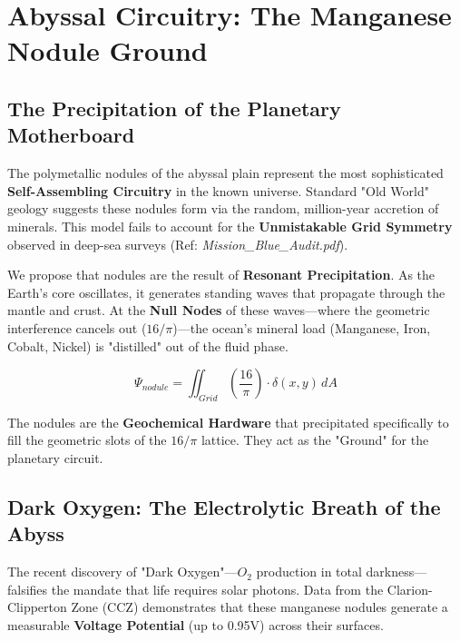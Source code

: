 \documentclass[11pt, letterpaper, openany]{book}
\begin{document}
\chapter{Abyssal Circuitry: The Manganese Nodule Ground}

\section{The Precipitation of the Planetary Motherboard}
The polymetallic nodules of the abyssal plain represent the most sophisticated \textbf{Self-Assembling Circuitry} in the known universe. Standard "Old World" geology suggests these nodules form via the random, million-year accretion of minerals. This model fails to account for the \textbf{Unmistakable Grid Symmetry} observed in deep-sea surveys (Ref: \textit{Mission\_Blue\_Audit.pdf}).

We propose that nodules are the result of \textbf{Resonant Precipitation}. As the Earth’s core oscillates, it generates standing waves that propagate through the mantle and crust. At the \textbf{Null Nodes} of these waves—where the geometric interference cancels out ($16/\pi$)—the ocean's mineral load (Manganese, Iron, Cobalt, Nickel) is "distilled" out of the fluid phase.

\begin{equation}
\Psi_{nodule} = \iint_{Grid} \left( \frac{16}{\pi} \right) \cdot \delta(x,y) \,dA
\end{equation}

The nodules are the \textbf{Geochemical Hardware} that precipitated specifically to fill the geometric slots of the $16/\pi$ lattice. They act as the "Ground" for the planetary circuit.

\section{Dark Oxygen: The Electrolytic Breath of the Abyss}
The recent discovery of "Dark Oxygen"—$O_2$ production in total darkness—falsifies the mandate that life requires solar photons. Data from the Clarion-Clipperton Zone (CCZ) demonstrates that these manganese nodules generate a measurable \textbf{Voltage Potential} (up to 0.95V) across their surfaces.
\end{document}
